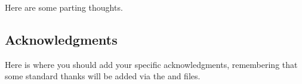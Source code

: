 \documentclass[\docopts]{\docclass}
\begin{document}
Here are some parting thoughts.



\subsection*{Acknowledgments}

Here is where you should add your specific acknowledgments, remembering that some standard thanks will be added via the  and  files.







\end{document}
